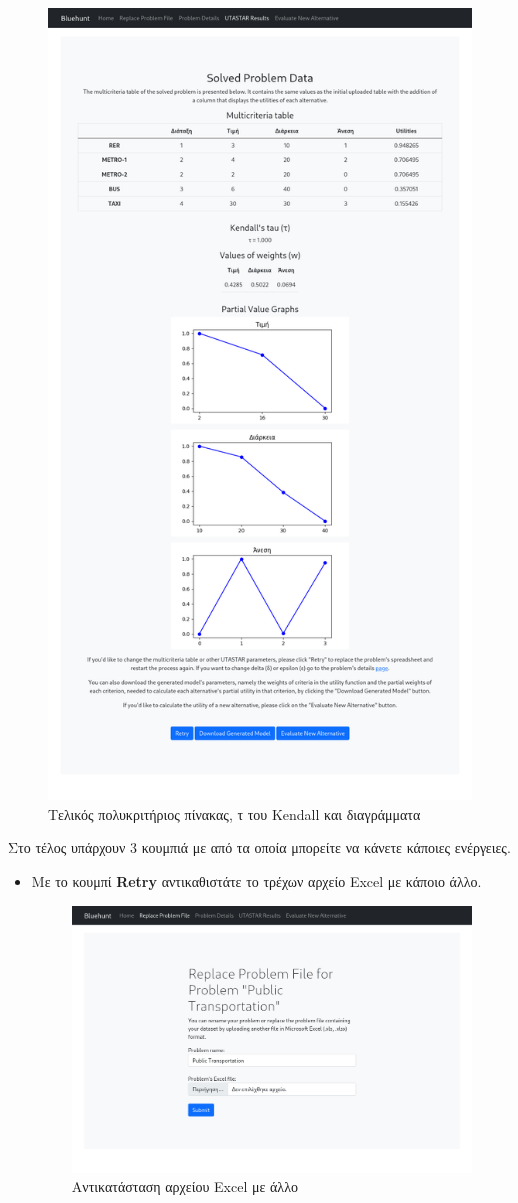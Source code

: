 \documentclass[11pt,a4paper,titlepage]{article}
\numberwithin{equation}{section}
\begin{document}
\begin{enumerate}
	\begin{figure}[H]
		\centering
		\includegraphics[width=0.65\linewidth]{media/results.png}
		\caption{Τελικός πολυκριτήριος πίνακας, τ του Kendall και διαγράμματα}
		\label{fig:results_1}
	\end{figure}
	

	Στο τέλος υπάρχουν 3 κουμπιά με από τα οποία μπορείτε να κάνετε κάποιες ενέργειες.
	
	\begin{itemize}
		\item Με το κουμπί \textbf{Retry} αντικαθιστάτε το τρέχων αρχείο Excel με κάποιο άλλο.
		
		\begin{figure}[H]
			\centering
			\includegraphics[width=0.8\linewidth]{media/retry.png}
			\caption{Αντικατάσταση αρχείου Excel με άλλο}
			\label{fig:retry}
		\end{figure}
	

\end{itemize}
\end{enumerate}
\end{document}
